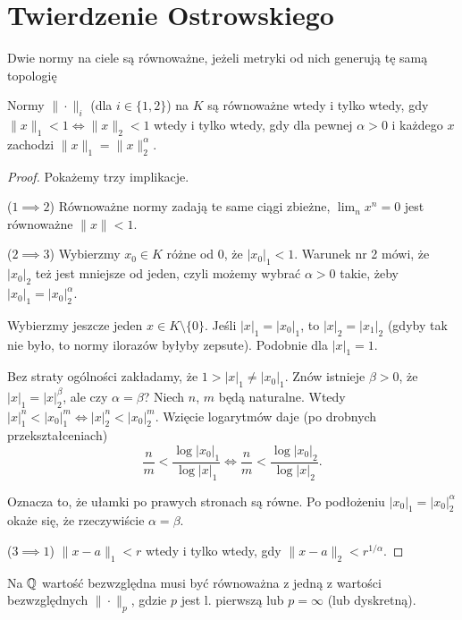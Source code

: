 \section{Twierdzenie Ostrowskiego}
\begin{definicja}
	Dwie normy na ciele są równoważne, jeżeli metryki od nich generują tę samą topologię
\end{definicja}

\begin{lemat}
	Normy $\|\cdot\|_i$ (dla $i \in \{1,2 \}$) na $K$ są równoważne wtedy i tylko wtedy, gdy $\|x\|_1 < 1 \Leftrightarrow \|x\|_2<1$ wtedy i tylko wtedy, gdy dla pewnej $\alpha > 0$ i każdego $x$ zachodzi $\|x\|_1 = \|x\|_2^\alpha$.
\end{lemat}

\begin{proof}
	Pokażemy trzy implikacje.

	($1 \implies 2$) Równoważne normy zadają te same ciągi zbieżne, $\lim_n x^n = 0$ jest równoważne $\|x\| < 1$.

	($2 \implies 3$) Wybierzmy $x_0 \in K$ różne od $0$, że $|x_0|_1 < 1$.
	Warunek nr 2 mówi, że $|x_0|_2$ też jest mniejsze od jeden, czyli możemy wybrać $\alpha > 0$ takie, żeby $|x_0|_1 = |x_0|_2^\alpha$.

	Wybierzmy jeszcze jeden $x \in K \setminus \{0\}$.
	Jeśli $|x|_1 = |x_0|_1$, to $|x|_2 = |x_1|_2$ (gdyby tak nie było, to normy ilorazów byłyby zepsute).
	Podobnie dla $|x|_1 = 1$.

	Bez straty ogólności zakładamy, że $1 > |x|_1 \neq |x_0|_1$.
	Znów istnieje $\beta > 0$, że $|x|_1 = |x|_2^\beta$, ale czy $\alpha = \beta$?
	Niech $n$, $m$ będą naturalne.
	Wtedy $|x|_1^n < |x_0|_1^m \iff |x|_2^n < |x_0|_2^m$.
	Wzięcie logarytmów daje (po drobnych przekształceniach)
	\[
		\frac nm < \frac{\log |x_0|_1}{\log |x|_1} \iff \frac n m < \frac{\log |x_0|_2}{\log |x|_2}.
	\]

	Oznacza to, że ułamki po prawych stronach są równe.
	Po podłożeniu $|x_0|_1 = |x_0|_2^\alpha$ okaże się, że rzeczywiście $\alpha = \beta$.

	($3 \implies 1$) $\|x-a\|_1 < r$ wtedy i tylko wtedy, gdy $\|x-a\|_2 < r^{1/\alpha}$.
\end{proof}

\begin{twierdzenie}[Ostrowski, 1916]
	Na $\mathbb{Q}$ wartość bezwzględna musi być równoważna z jedną z wartości bezwzględnych $\|\cdot\|_p$, gdzie $p$ jest l. pierwszą lub $p = \infty$ (lub dyskretną).
\end{twierdzenie}

